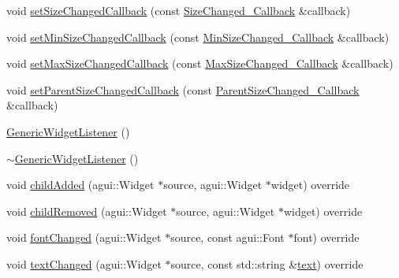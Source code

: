 \begin{DoxyCompactItemize}
\item 
void \mbox{\hyperlink{classec_1_1_generic_widget_listener_a0134a3a31286124c989a27846ff8fb3d}{set\+Size\+Changed\+Callback}} (const \mbox{\hyperlink{classec_1_1_generic_widget_listener_aa47779ac982662cd4466132fa13fae68}{Size\+Changed\+\_\+\+Callback}} \&callback)
\item 
void \mbox{\hyperlink{classec_1_1_generic_widget_listener_af3704b6d810f1786062e452ffec1f643}{set\+Min\+Size\+Changed\+Callback}} (const \mbox{\hyperlink{classec_1_1_generic_widget_listener_a3a7f28218f30331b12bc00d05f4bc34f}{Min\+Size\+Changed\+\_\+\+Callback}} \&callback)
\item 
void \mbox{\hyperlink{classec_1_1_generic_widget_listener_a0cb16223c3d04b2d4ac232d65addd6a4}{set\+Max\+Size\+Changed\+Callback}} (const \mbox{\hyperlink{classec_1_1_generic_widget_listener_aa7b919052f00bb1241477c3681ddf06b}{Max\+Size\+Changed\+\_\+\+Callback}} \&callback)
\item 
void \mbox{\hyperlink{classec_1_1_generic_widget_listener_aaa4ba3b0f552b8b55d02fb8d20fa13e6}{set\+Parent\+Size\+Changed\+Callback}} (const \mbox{\hyperlink{classec_1_1_generic_widget_listener_acf92a781f3b2f06053cd1c100b6763d3}{Parent\+Size\+Changed\+\_\+\+Callback}} \&callback)
\item 
\mbox{\hyperlink{classec_1_1_generic_widget_listener_ae7f896e4a180743e37378da148419a0c}{Generic\+Widget\+Listener}} ()
\item 
\mbox{\hyperlink{classec_1_1_generic_widget_listener_ac73bbafa516fd7133decc5c423c52a4e}{$\sim$\+Generic\+Widget\+Listener}} ()
\item 
void \mbox{\hyperlink{classec_1_1_generic_widget_listener_aaf6a3994b344a540709ee21d3ac7055e}{child\+Added}} (agui\+::\+Widget $\ast$source, agui\+::\+Widget $\ast$widget) override
\item 
void \mbox{\hyperlink{classec_1_1_generic_widget_listener_a504f50b49890512df4694b3fd4bfa2a2}{child\+Removed}} (agui\+::\+Widget $\ast$source, agui\+::\+Widget $\ast$widget) override
\item 
void \mbox{\hyperlink{classec_1_1_generic_widget_listener_abcd4597f2dfede6e884957fa18a2e5a3}{font\+Changed}} (agui\+::\+Widget $\ast$source, const agui\+::\+Font $\ast$font) override
\item 
void \mbox{\hyperlink{classec_1_1_generic_widget_listener_a9be71b4dbb023b6e247427326e73b760}{text\+Changed}} (agui\+::\+Widget $\ast$source, const std\+::string \&\mbox{\hyperlink{namespaceec_a0bdee24285d69deca899e166b29c0150}{text}}) override
\item 

\end{DoxyCompactItemize}
